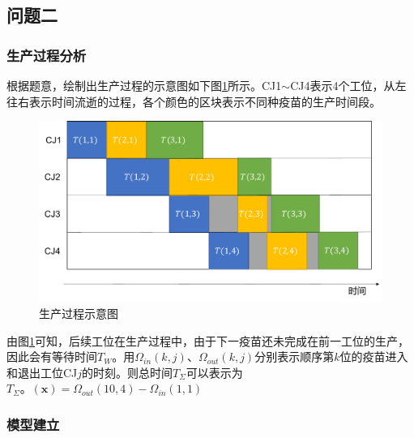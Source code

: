 \documentclass[UTF8]{ctexart}
\begin{document}
	\subsection{问题二}
	\subsubsection{生产过程分析}
	根据题意，绘制出生产过程的示意图如下图\ref{pipeline1}所示。CJ1$\sim$CJ4表示4个工位，从左往右表示时间流逝的过程，各个颜色的区块表示不同种疫苗的生产时间段。
	\begin{figure}[H]
		\centering %
		\includegraphics[scale=0.5]{pipe1.pdf}
		\caption{生产过程示意图}\label{pipeline1}
	\end{figure}
	由图\ref{pipeline1}可知，后续工位在生产过程中，由于下一疫苗还未完成在前一工位的生产，因此会有等待时间$T_{W}$。用$\Omega_{in}(k,j)$、$\Omega_{out}(k,j)$分别表示顺序第$k$位的疫苗进入和退出工位CJ$j$的时刻。则总时间$T_{\Sigma}$可以表示为$T_{\Sigma}。(\boldsymbol{x})=\Omega_{out}(10,4)-\Omega_{in}(1,1)$
	\subsubsection{模型建立}
%		
	
\end{document}
